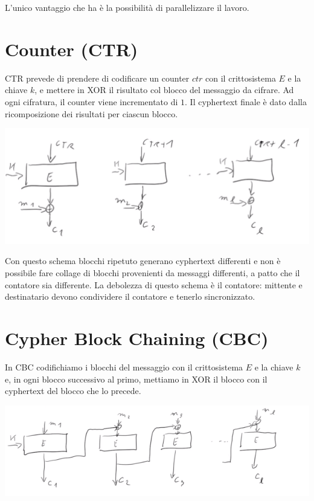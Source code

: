\noindent L'unico vantaggio che ha è la possibilità di parallelizzare il lavoro. 

\section{Counter (CTR)}
CTR prevede di prendere di codificare un counter $ctr$ con il crittosistema $E$ e la chiave $k$, e mettere in XOR il risultato col blocco del messaggio da cifrare. Ad ogni cifratura, il counter viene incrementato di $1$. Il cyphertext finale è dato dalla ricomposizione dei risultati per ciascun blocco. 

\begin{center}
    \includegraphics[width=1\textwidth]{images/CTR.png}
\end{center}

\noindent Con questo schema blocchi ripetuto generano cyphertext differenti e non è possibile fare collage di blocchi provenienti da messaggi differenti, a patto che il contatore sia differente. La debolezza di questo schema è il contatore: mittente e destinatario devono condividere il contatore e tenerlo sincronizzato. 

\section{Cypher Block Chaining (CBC)}
In CBC codifichiamo i blocchi del messaggio con il crittosistema $E$ e la chiave $k$ e, in ogni blocco successivo al primo, mettiamo in XOR il blocco con il cyphertext del blocco che lo precede. 

\begin{center}
    \includegraphics[width=1\textwidth]{images/CBC.png}
\end{center}

